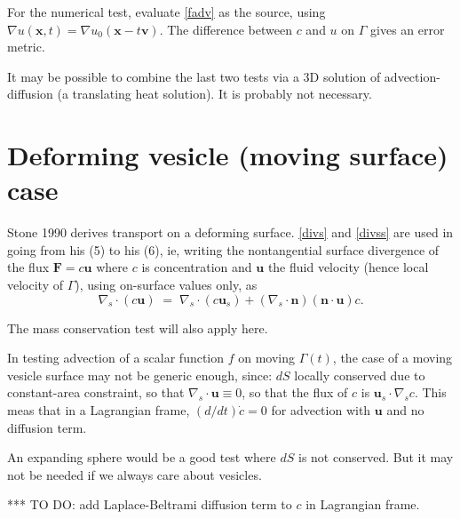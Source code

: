 \documentclass[11pt]{article}
\newcommand{\mbf}[1]{{\mathbf #1}}
\newcommand{\x}{\mbf{x}}
\newcommand{\n}{\mbf{n}}
\newcommand{\uu}{\mbf{u}}
\newcommand{\vv}{\mbf{v}}
\begin{document}
For the numerical test,
evaluate \eqref{fadv} as the source, using
$\nabla u(\x,t) = \nabla u_0(\x-t\vv)$.
The difference between $c$ and $u$ on $\Gamma$ gives an error metric.

It may be possible to combine the last two tests via
a 3D solution of advection-diffusion (a translating heat solution).
It is probably not necessary.


\section{Deforming vesicle (moving surface) case}

Stone 1990 derives transport on a deforming surface.
\eqref{divs} and \eqref{divss} are used in going from his (5) to his (6),
ie, writing the nontangential surface divergence
of the flux $\mbf{F} = c\uu$ where $c$ is concentration and $\uu$ the
fluid velocity (hence local
velocity of $\Gamma$),
using on-surface values only, as
$$\nabla_s \cdot (c\uu) \;=\;
\nabla_s\cdot (c\uu_s) + (\nabla_s\cdot\n)
(\n\cdot\uu) c.$$

The mass conservation test will also apply here.

In testing advection of a scalar function $f$ on moving
$\Gamma(t)$, the case of a moving vesicle surface
may not be generic enough,
since: $dS$ locally conserved due to constant-area constraint,
so that $\nabla_s \cdot \uu \equiv 0$, so that the flux of $c$
is $\uu_s \cdot \nabla_s c$.
This meas that in a Lagrangian frame,
$(d/dt) \dot c  = 0$ for advection with $\uu$ and no diffusion term.

An expanding sphere would  be a good test where $dS$ is not conserved.
But it may not be needed if we always care about vesicles.

*** TO DO: add Laplace-Beltrami diffusion term to $c$ in Lagrangian frame.



%
%
\end{document}
